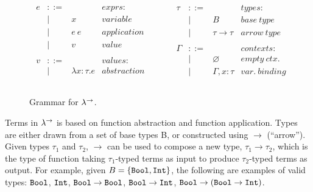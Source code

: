\begin{figure}[h]
\vspace{-5pt}

\[
\begin{array}{lll}

\begin{array}{lllr}

e & ::= & ~ & exprs: \\
	& | & x & variable \\
	& | & e~e & application \\
	& | & v & value \\
	&&\\
	
v & ::= & ~ & values: \\
	& | & \lambda x: \tau . e & abstraction \\
	&&\\
	
\end{array}

& ~~~~~~ &

\begin{array}{lllr}

\tau & ::= & ~ & types: \\
	& | & B & base~type \\
	& | & \tau \rightarrow \tau & arrow~type \\
	&&\\
	
\Gamma & ::= & ~ & contexts: \\
	& | & \varnothing & empty~ctx. \\
	& | & \Gamma, x: \tau & var.~binding \\
	&&\\
	
\end{array}

\end{array}
\]

\vspace{-7pt}
\caption{Grammar for $\lambda^{\rightarrow}$.}
\label{This is the label.}
\end{figure}


Terms in $\lambda^{\rightarrow}$ is based on function abstraction and function application. Types are either drawn from a set of base types B, or constructed using $\rightarrow$ (``arrow''). Given types $\tau_1$ and $\tau_2$, $\rightarrow$ can be used to compose a new type, $\tau_1 \rightarrow \tau_2$, which is the type of function taking $\tau_1$-typed terms as input to produce $\tau_2$-typed terms as output. For example, given $B = \{ \mathtt{Bool}, \mathtt{Int} \}$, the following are examples of valid types: $\mathtt{Bool}$, $\mathtt{Int}$, $\mathtt{Bool} \rightarrow \mathtt{Bool}$, $\mathtt{Bool} \rightarrow \mathtt{Int}$, $\mathtt{Bool} \rightarrow (\mathtt{Bool} \rightarrow \mathtt{Int})$.

